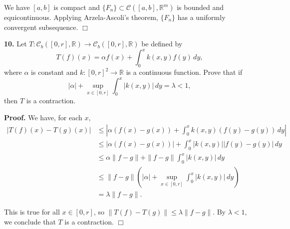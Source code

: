 \documentclass{article}
\begin{document}
We have $[a,b]$ is compact and
$\{F_n\} \subset \mathcal{C}([a,b] ,\mathbb{R}^m)$ is bounded and
equicontinuous. Applying Arzela-Ascoli's theorem, $\{F_n\}$ has a
uniformly convergent subsequence. $\Box$

    \textbf{10.} Let
$T : \mathcal{C}_b([0, r], \mathbb{R}) \to \mathcal{C}_b([0, r], \mathbb{R})$
be defined by \[ T(f)(x) = \alpha f(x) +\int_0^x k(x,y)f(y)\,dy,\] where
$\alpha$ is constant and $k : [0, r]^2 \to\mathbb{R}$ is a continuous
function. Prove that if
\[ |\alpha|+\sup_{x\in [ 0, r]}\int_0^x |k(x,y)|\,dy = \lambda < 1,\]
then $T$ is a contraction.

\textbf{Proof.} We have, for each $x$, \[\begin{aligned}
|T(f)(x)-T(g)(x)| &\le \left| \alpha (f(x) - g(x)) + \int_0^x k(x,y) (f(y)-g(y))\, dy\right| \\
&\le \left| \alpha (f(x) - g(x)) \right|+ \int_0^x |k(x,y)|| f(y)-g(y)|\, dy \\
&\le \alpha \|f-g\| +\|f-g\| \int_0^x|k(x,y)|\,dy \\
&\le \|f - g\|\left (|\alpha| + \sup_{x\in [0,r]} \int_0^x |k(x,y)|\,dy \right)\\
&= \lambda \|f-g\|.
\end{aligned}\]

This is true for all $x\in [0,r]$, so
$\|T(f) - T(g)\| \le \lambda \|f -g\|$. By $\lambda < 1$, we conclude
that $T$ is a contraction. $\Box$


    
    
    
    
\end{document}
